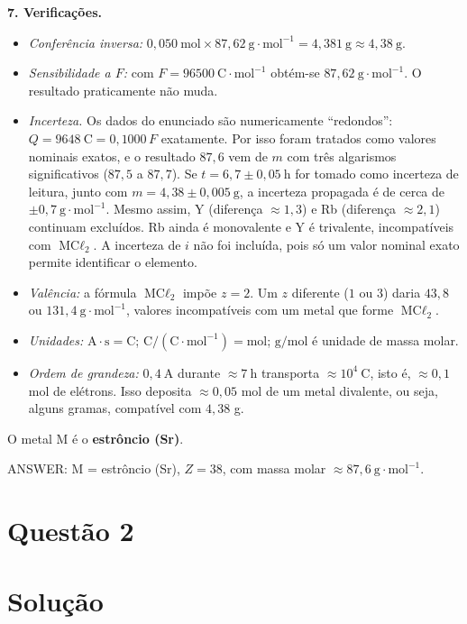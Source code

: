 \documentclass{article}%
\begin{document}
\textbf{7. Verificações.}
\begin{itemize}
\item \emph{Conferência inversa:} $0{,}050\ \text{mol}\times 87{,}62\ \text{g}\cdot\text{mol}^{-1} = 4{,}381\ \text{g}\approx 4{,}38\ \text{g}$.
\item \emph{Sensibilidade a $F$:} com $F=96500\ \text{C}\cdot\text{mol}^{-1}$ obtém-se $87{,}62\ \text{g}\cdot\text{mol}^{-1}$. O resultado praticamente não muda.
\item \emph{Incerteza.} Os dados do enunciado são numericamente ``redondos'': $Q = 9648\ \text{C} = 0{,}1000\,F$ exatamente. Por isso foram tratados como valores nominais exatos, e o resultado $87{,}6$ vem de $m$ com três algarismos significativos ($87{,}5$ a $87{,}7$). Se $t = 6{,}7 \pm 0{,}05\ \text{h}$ for tomado como incerteza de leitura, junto com $m = 4{,}38 \pm 0{,}005\ \text{g}$, a incerteza propagada é de cerca de $\pm 0{,}7\ \text{g}\cdot\text{mol}^{-1}$. Mesmo assim, Y (diferença $\approx 1{,}3$) e Rb (diferença $\approx 2{,}1$) continuam excluídos. Rb ainda é monovalente e Y é trivalente, incompatíveis com $\text{MC}\ell_2$. A incerteza de $i$ não foi incluída, pois só um valor nominal exato permite identificar o elemento.
\item \emph{Valência:} a fórmula $\text{MC}\ell_2$ impõe $z=2$. Um $z$ diferente ($1$ ou $3$) daria $43{,}8$ ou $131{,}4\ \text{g}\cdot\text{mol}^{-1}$, valores incompatíveis com um metal que forme $\text{MC}\ell_2$.
\item \emph{Unidades:} $\text{A}\cdot\text{s}=\text{C}$; $\text{C}/(\text{C}\cdot\text{mol}^{-1})=\text{mol}$; $\text{g}/\text{mol}$ é unidade de massa molar.
\item \emph{Ordem de grandeza:} $0{,}4\ \text{A}$ durante $\approx 7\ \text{h}$ transporta $\approx 10^{4}\ \text{C}$, isto é, $\approx 0{,}1$ mol de elétrons. Isso deposita $\approx 0{,}05$ mol de um metal divalente, ou seja, alguns gramas, compatível com $4{,}38$ g.
\end{itemize}

O metal M é o \textbf{estrôncio (Sr)}.

ANSWER: M = estrôncio (Sr), $Z = 38$, com massa molar $\approx 87{,}6\ \text{g}\cdot\text{mol}^{-1}$.%
\newpage%
\section*{Questão 2}

\section*{Solução}
\end{document}
